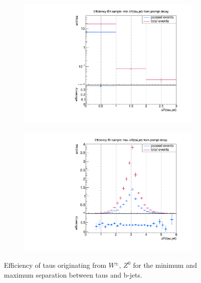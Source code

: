 %
%
\begin{figure}
  \centering
                \begin{subfigure}[t]{0.49\textwidth}
                \includegraphics[width=\textwidth]{figures/plots/ttH/Divided_pr_mindR_taujet.pdf}
                \label{dR:prompt:taubjets:min}
                \end{subfigure}
                \begin{subfigure}[t]{0.49\textwidth}
                \includegraphics[width=\textwidth]{figures/plots/ttH/Divided_maxdR_pr_taujet.pdf}
                \label{dR:prompt:taubjets:max}
                \end{subfigure}
\caption[Efficiency of taus originating from $W^\pm$, $Z^0$ for the separation between taus and b-jets.]{Efficiency of taus originating from $W^\pm$, $Z^0$ for the minimum and maximum separation between taus and b-jets.}
\label{dR:prompt:taubjets}
\end{figure}
